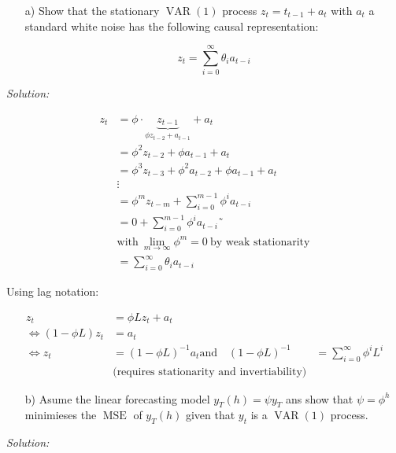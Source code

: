 \documentclass[12pt,a4paper]{article}
\newcommand{\MSE}{\operatorname{MSE}} %
\newcommand{\VAR}{\operatorname{VAR}} %
\begin{document}
\begin{itemize}
  \item[a)] Show that the stationary $\VAR(1)$ process $z_t = t_{t-1} + a_t$ with $a_t$ a standard white noise has the following causal representation:
  
  $$z_t = \sum_{i  = 0}^{\infty} \theta_i a_{t-i} $$
\end{itemize}

\emph{Solution:}

\begin{align*}
  z_t & = \phi \cdot \underbrace{z_{t-1}}_{\phi z_{t-2} + a_{t-1}} + a_t \\
  & = \phi^2 z_{t-2} + \phi a_{t-1} + a_t\\
  & = \phi^3 z_{t-3} + \phi^2 a_{t-2} + \phi a_{t-1} + a_t\\
  & \vdots \\
  & = \phi^m z_{t -m} + \sum_{i = 0}^{m - 1} \phi^i a_{t-i}\\
  & = 0 + \sum_{i = 0}^{m - 1} \phi^i a_{t-i}˜ \\
  & \text{with} \ \lim_{m \rightarrow \infty} \phi^m = 0 \ \text{by weak stationarity}\\
  & = \sum_{i = 0}^{\infty} \theta_i a_{t-i}
\end{align*}

Using lag notation:

\begin{align*}
  z_t & = \phi  L z_t + a_t \\
  \Leftrightarrow (1 - \phi L)z_t & = a_t \\
  \Leftrightarrow z_t & = (1 - \phi L)^{-1} a_t
  \text{and} \quad (1 - \phi L)^{-1} & = \sum_{i = 0}^{\infty} \phi^i L^i \\
  & \text{(requires stationarity and invertiability)}
\end{align*}

\begin{itemize}
  \item[b)] Asume the linear forecasting model $y_T (h) = \psi y_T$ ans show that $\psi = \phi^h$ minimieses the $\MSE$ of $y_T (h)$  given that $y_t$ is a $\VAR(1)$ process. 
\end{itemize}

\emph{Solution:}
\end{document}
